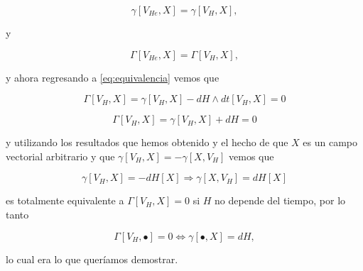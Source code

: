 \documentclass[a4paper,10pt]{article}
\numberwithin{equation}{section}
\begin{document}
\begin{equation}
 \gamma[V_{He},X] = \gamma[V_H,X],
\end{equation}

y

\begin{equation}
 \Gamma[V_{He},X] = \Gamma[V_H,X],
\end{equation}

y ahora regresando a \eqref{eq:equivalencia} vemos que 

\begin{equation}
 \Gamma[V_H,X] = \gamma[V_H,X] - dH \wedge dt[V_H,X] = 0
\end{equation}

\begin{equation}
 \Gamma[V_H,X] = \gamma[V_H,X] + dH = 0
\end{equation}

y utilizando los resultados que hemos obtenido y el hecho de que $X$ es un campo 
vectorial arbitrario y que $ \gamma[V_H,X] =  - \gamma[X,V_H]$ vemos que 

\begin{equation}
 \gamma[V_H,X] = - dH[X] \Rightarrow \gamma[X,V_H] = dH[X]
\end{equation}

es totalmente equivalente a $\Gamma[V_H,X] = 0$ si $H$ no depende del tiempo, por lo tanto 

\begin{equation}
 \Gamma[V_H,\bullet] = 0 \Leftrightarrow \gamma[\bullet,X] = dH,
\end{equation}

lo cual era lo que queríamos demostrar. 
\end{document}
